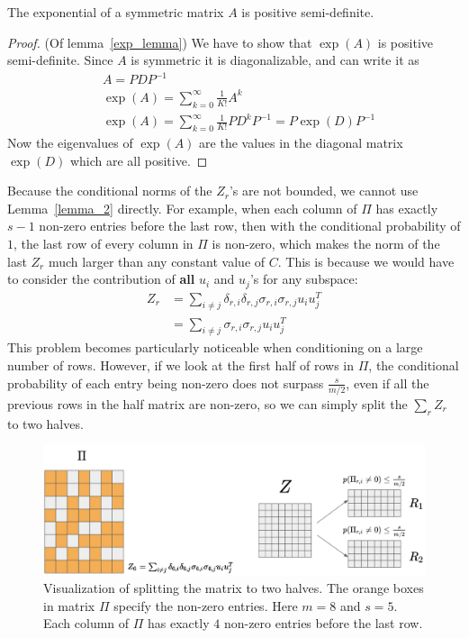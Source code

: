 \begin{lemma}
    The exponential of a symmetric matrix $A$ is positive semi-definite.
\label{exp_lemma}
\end{lemma}
\begin{proof}(Of lemma~\ref{exp_lemma})
    We have to show that $\exp(A)$ is positive semi-definite.
        Since $A$ is symmetric it is diagonalizable, and can write it as
        \begin{align*}
            &A  = P D P ^{-1}\\
            &\exp(A) = \sum_{k = 0}^{\infty} \frac{1}{K!} A^k\\
            &\exp(A) = \sum_{k = 0}^{\infty}  \frac{1}{K!} P D^k P^{-1} = P \exp(D) P^{-1}
        \end{align*}
    Now the eigenvalues of $\exp(A)$ are the values in the diagonal matrix $\exp(D)$ which are all positive. 
\end{proof}


Because the conditional norms of the $Z_r$'s are not bounded, we cannot use Lemma~\ref{lemma_2} directly.
For example, when each column of $\Pi$ has exactly $s - 1$ non-zero entries before the last row, then with the conditional probability of $1$, the last row of every column in $\Pi$ is non-zero, which makes the norm of the last $Z_r$ much larger than any constant value of $C$. This is because we would have to consider the contribution of \textbf{all} $u_i$ and $u_j$'s for any subspace:
\begin{align*}
    Z_r & = \sum_{i \neq j} \delta_{r,i} \delta_{r, j} \sigma_{r, i} \sigma_{r, j} u_i u_j ^T \\
    & =  \sum_{i \neq j} \sigma_{r, i} \sigma_{r, j} u_i u_j ^T
\end{align*}
This problem becomes particularly noticeable when conditioning on a large number of rows.
However, if we look at the first half of rows in $\Pi$, the conditional probability of each entry being non-zero does not surpass $\frac{s}{m/2}$, even if all the previous rows in the half matrix are non-zero, so we can simply split the $\sum_r Z_r$ to two halves. 

\begin{figure}
    \centering
\includegraphics[width=15cm]{figures/splitting.png}
    \caption{Visualization of splitting the matrix to two halves. The orange boxes in matrix $\Pi$ specify the non-zero entries. Here $m = 8$ and $s = 5$. Each column of $\Pi$ has exactly $4$ non-zero entries before the last row.}
    \label{fig:splitting}
\end{figure}

